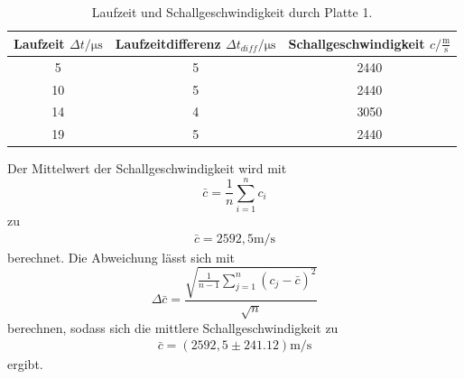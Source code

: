 \begin{table}[H]
  \centering
  \caption{Laufzeit und Schallgeschwindigkeit durch Platte 1.}
  \label{tab:ImpLaufzeit}
  \begin{tabular}{S[table-format=2.0] S[table-format=1.0] S[table-format=4.0] }
  \toprule
  {Laufzeit $\Delta t / \si{\micro\second}$} & {Laufzeitdifferenz $\Delta t_{diff} / \si{\micro\second}$} & {Schallgeschwindigkeit $c / \frac{\si{\meter}}{\si{\second}}$}\\
     & 5 & 2440  \\
    10  & 5 & 2440  \\
    14  & 4 & 3050  \\
    19  & 5 & 2440  \\
  \bottomrule
  \end{tabular}
\end{table}
Der Mittelwert der Schallgeschwindigkeit wird mit 
\begin{equation}
  \bar{c}=\frac{1}{n} \sum_{i=1}^n c_i \label{eqn:Mittelwert}
\end{equation}
zu
\begin{align*}
  \bar{c}=2592,5 \si{\meter\per\second}
\end{align*}
berechnet. Die Abweichung lässt sich mit
\begin{equation}
  \Delta \bar{c} = \frac{\sqrt{\frac{1}{n-1}\sum_{j=1}^n (c_j-\bar{c})^2}}{\sqrt{n}} \label{eqn:standabw}
\end{equation}
berechnen, sodass sich die mittlere Schallgeschwindigkeit zu
\begin{align*}
  \bar{c}= (2592,5 \pm 241.12) \si{\meter\per\second}
\end{align*}
ergibt.

